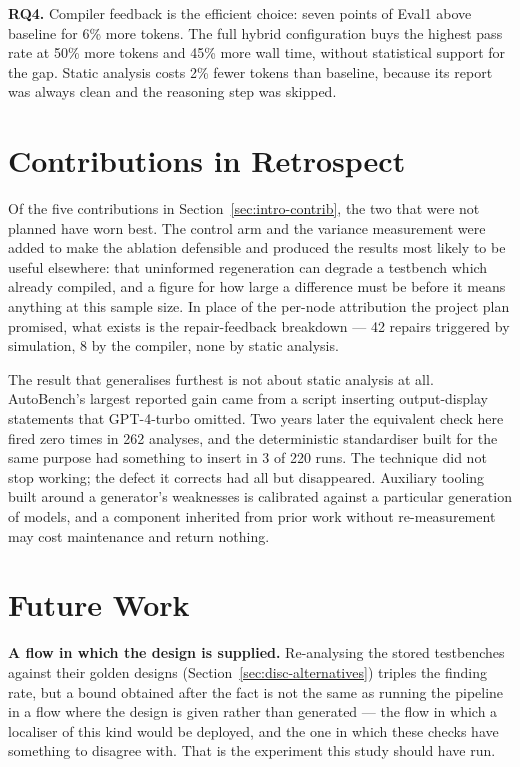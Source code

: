 \documentclass[11pt,a4paper,titlepage=false]{scrreprt}
\begin{document}
\textbf{RQ4.} Compiler feedback is the efficient choice: seven points of Eval1 above
baseline for 6\% more tokens. The full hybrid configuration buys the highest pass rate at
50\% more tokens and 45\% more wall time, without statistical support for the gap. Static
analysis costs 2\% fewer tokens than baseline, because its report was always clean and the
reasoning step was skipped.

\section{Contributions in Retrospect}\label{sec:concl-contrib}

Of the five contributions in Section~\ref{sec:intro-contrib}, the two that were not planned
have worn best. The control arm and the variance measurement were added to make the ablation
defensible and produced the results most likely to be useful elsewhere: that uninformed
regeneration can degrade a testbench which already compiled, and a figure for how large a
difference must be before it means anything at this sample size. In place of the per-node
attribution the project plan promised, what exists is the repair-feedback breakdown --- 42
repairs triggered by simulation, 8 by the compiler, none by static analysis.

The result that generalises furthest is not about static analysis at all. AutoBench's largest
reported gain came from a script inserting output-display statements that GPT-4-turbo
omitted. Two years later the equivalent check here fired zero times in 262 analyses, and the
deterministic standardiser built for the same purpose had something to insert in 3 of 220
runs. The technique did not stop working; the defect it corrects had all but disappeared.
Auxiliary
tooling built around a generator's weaknesses is calibrated against a particular generation of
models, and a component inherited from prior work without re-measurement may cost maintenance
and return nothing.

\section{Future Work}\label{sec:concl-future}

\textbf{A flow in which the design is supplied.} Re-analysing the stored testbenches against
their golden designs (Section~\ref{sec:disc-alternatives}) triples the finding rate, but a
bound obtained after the fact is not the same as running the pipeline in a flow where the
design is given rather than generated --- the flow in which a localiser of this kind would be
deployed, and the one in which these checks have something to disagree with. That is the
experiment this study should have run.
\end{document}
